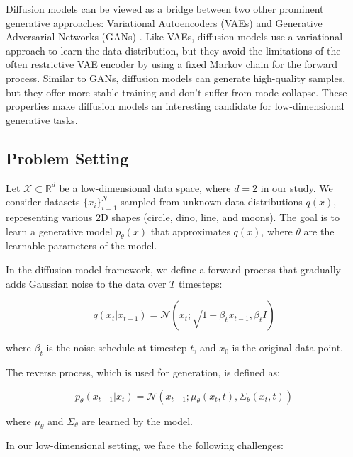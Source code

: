 \documentclass{article} %
\begin{document}
Diffusion models can be viewed as a bridge between two other prominent generative approaches: Variational Autoencoders (VAEs) \cite{vae} and Generative Adversarial Networks (GANs) \cite{gan}. Like VAEs, diffusion models use a variational approach to learn the data distribution, but they avoid the limitations of the often restrictive VAE encoder by using a fixed Markov chain for the forward process. Similar to GANs, diffusion models can generate high-quality samples, but they offer more stable training and don't suffer from mode collapse. These properties make diffusion models an interesting candidate for low-dimensional generative tasks.

\subsection{Problem Setting}
\label{subsec:problem_setting}

Let $\mathcal{X} \subset \mathbb{R}^d$ be a low-dimensional data space, where $d = 2$ in our study. We consider datasets $\{x_i\}_{i=1}^N$ sampled from unknown data distributions $q(x)$, representing various 2D shapes (circle, dino, line, and moons). The goal is to learn a generative model $p_\theta(x)$ that approximates $q(x)$, where $\theta$ are the learnable parameters of the model.

In the diffusion model framework, we define a forward process that gradually adds Gaussian noise to the data over $T$ timesteps:

\begin{equation}
    q(x_t | x_{t-1}) = \mathcal{N}(x_t; \sqrt{1 - \beta_t}x_{t-1}, \beta_t I)
\end{equation}

where $\beta_t$ is the noise schedule at timestep $t$, and $x_0$ is the original data point.

The reverse process, which is used for generation, is defined as:

\begin{equation}
    p_\theta(x_{t-1} | x_t) = \mathcal{N}(x_{t-1}; \mu_\theta(x_t, t), \Sigma_\theta(x_t, t))
\end{equation}

where $\mu_\theta$ and $\Sigma_\theta$ are learned by the model.

In our low-dimensional setting, we face the following challenges:
\end{document}
